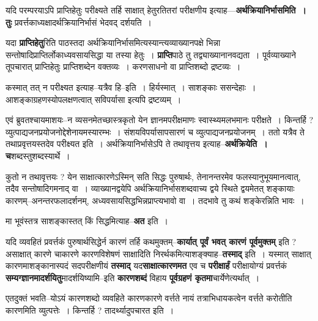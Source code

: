 \documentclass[article,12pt,a4paper]{memoir}
\begin{document}
	  \endgroup
	

	  \pstart यदि परम्परयाऽपि प्राप्तिहेतुः परीक्ष्यते तर्हि साक्षात् हेतुरतितरां परीक्षणीय इत्याह—\textbf{अर्थक्रियानिर्भासमिति । तुः} प्रवर्त्तकाध्यक्षादर्थक्रियानिर्भासं भेदवद् दर्शयति ।
	\pend
      

	  \pstart यदा \textbf{प्राप्तिहेतु}रिति पाठस्तदा अर्थक्रियानिर्भासमित्यस्यान्त्यव्याख्यानपक्षे भिन्ना सन्तोषादिप्राप्तिर्लोकाध्यवसायसिद्धा या तस्या हेतुः । \textbf{प्राप्ति}पाठे तु तद्व्याख्यानानवद्यता । पूर्वव्याख्याने तूपचारात् प्राप्तिहेतुः प्राप्तिशब्देन वक्तव्यः । करणसाधनो वा प्राप्तिशब्दो द्रष्टव्यः ।
	\pend
      

	  \pstart कस्मात् तत् न परीक्ष्यत इत्याह--यत्रैव हि--इति । हिर्यस्मात् । साशङ्काः ससन्देहाः । आशङ्काग्रहणस्योपलक्षणत्वात् सविपर्यासा इत्यपि द्रष्टव्यम् ।
	\pend
      

	  \pstart एवं ब्रुवतश्चायमाशयः--न व्यसनमेतच्छास्त्रकृतो येन ज्ञानमपरीक्षमाणः स्वास्थ्यमलभमानः परीक्षते । किन्तर्हि ? व्युत्पाद्यजनप्रयोजनोद्देशेनायमस्यारम्भः । संशयविपर्यासापसारणं च व्युत्पाद्यजनप्रयोजनम् । ततो यत्रैव ते तथाप्रवृत्तयस्तदेव परीक्ष्यत इति । अर्थक्रियानिर्भासेऽपि ते तथावृत्तय इत्याह--\textbf{अर्थक्रियेति । च}शब्दस्तुशब्दस्यार्थे ।
	\pend
      

	  \pstart कुतो न तथावृत्तयः ? येन साक्षात्कारणेऽस्मिन् सति सिद्धः पुरुषार्थः, तेनानन्तरमेव फलस्यानुभूयमानत्वात्, तदैव सन्तोषादिगमनाद् वा । व्याख्यानद्वयेपि अर्थक्रियानिर्भासशब्दवाच्य द्वये स्थिते द्वयमेतत् शङ्कायाः कारणम्--अनन्तरफलादर्शनम्, अध्यवसायसिद्धभिन्नप्राप्त्यभावो वा । तदभावे तु कथं शङ्केरन्निति भावः ।
	\pend
      

	  \pstart मा भूवंस्तत्र साशङ्कास्तत् किं सिद्धमित्याह--\textbf{अत} इति ।
	\pend
      

	  \pstart यदि व्यवहितं प्रवर्त्तकं पुरुषार्थसिद्धेर्न कारणं तर्हि कथमुक्तम्--\textbf{कार्यात् पूर्वं भवत् कारणं पूर्वमुक्तम्} इति ? असाक्षात् कारणे चाकारणे कारण\leavevmode{}विशेषणं साक्षादिति निरर्थकमित्याशङ्क्याह--\textbf{तस्माद्} इति । यस्मात् साक्षात् कारणमाशङ्कानास्पदं सदपरीक्षणीयं \textbf{तस्माद्} यद\textbf{साक्षात्कारणमत} एव च \textbf{परीक्षार्हं} परीक्षायोग्यं प्रवर्त्तकं \textbf{सम्यग्ज्ञानमादर्शयितु}मादर्शयिष्यामि--इति \textbf{कारणशब्दं} विहाय \textbf{पूर्वग्रहणं कृतमा}चार्येणेत्यर्थात् ।
	\pend
      

	  \pstart एतदुक्तं भवति--योऽयं कारणशब्दो व्यवहिते कारणकारणे वर्त्तते नायं तत्राभिधायकत्वेन वर्त्तते करोतीति कारणमिति व्युत्पत्तेः । किन्तर्हि ? तादर्थ्यादुपचारत इति ।
	\pend
	  \bigskip
	  \begingroup
	
\end{document}
